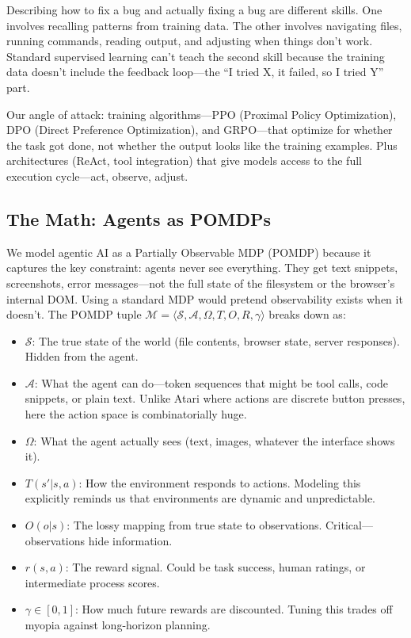 \documentclass[12pt,a4paper]{report}
\theoremstyle{definition}
\begin{document}
Describing how to fix a bug and actually fixing a bug are different skills. One involves recalling patterns from training data. The other involves navigating files, running commands, reading output, and adjusting when things don't work. Standard supervised learning can't teach the second skill because the training data doesn't include the feedback loop---the ``I tried X, it failed, so I tried Y'' part.

Our angle of attack: training algorithms---PPO (Proximal Policy Optimization), DPO (Direct Preference Optimization), and GRPO---that optimize for whether the task got done, not whether the output looks like the training examples. Plus architectures (ReAct, tool integration) that give models access to the full execution cycle---act, observe, adjust.

\subsection{The Math: Agents as POMDPs}
We model agentic AI as a Partially Observable MDP (POMDP) because it captures the key constraint: agents never see everything. They get text snippets, screenshots, error messages---not the full state of the filesystem or the browser's internal DOM. Using a standard MDP would pretend observability exists when it doesn't. The POMDP tuple $\mathcal{M} = \langle \mathcal{S}, \mathcal{A}, \Omega, T, O, R, \gamma \rangle$ breaks down as:
\begin{itemize}
    \item $\mathcal{S}$: The true state of the world (file contents, browser state, server responses). Hidden from the agent.
    \item $\mathcal{A}$: What the agent can do---token sequences that might be tool calls, code snippets, or plain text. Unlike Atari where actions are discrete button presses, here the action space is combinatorially huge.
    \item $\Omega$: What the agent actually sees (text, images, whatever the interface shows it).
    \item $T(s'|s,a)$: How the environment responds to actions. Modeling this explicitly reminds us that environments are dynamic and unpredictable.
    \item $O(o|s)$: The lossy mapping from true state to observations. Critical---observations hide information.
    \item $r(s,a)$: The reward signal. Could be task success, human ratings, or intermediate process scores.
    \item $\gamma \in [0,1]$: How much future rewards are discounted. Tuning this trades off myopia against long-horizon planning.
\end{itemize}
\end{document}
